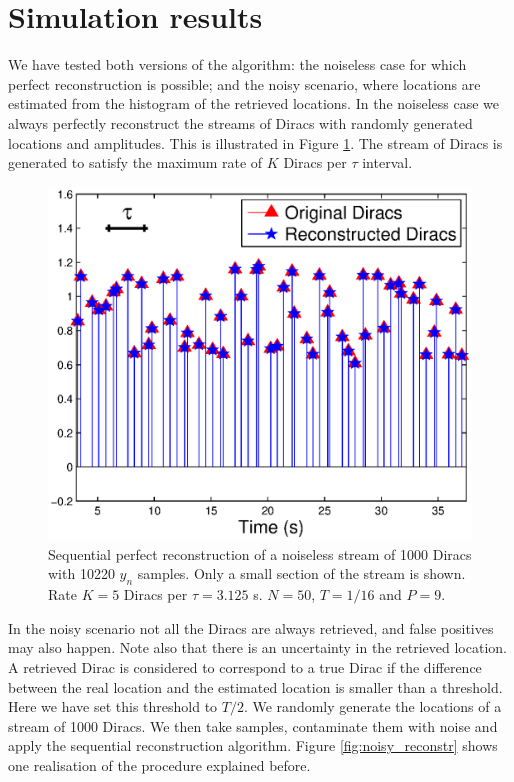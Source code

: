 \documentclass{article}
\providecommand{\red}[1]{\textcolor{red}{#1}}
\begin{document}
\section{Simulation results}
\label{sec:simulations}

We have tested both versions of the algorithm: the noiseless case for which perfect
reconstruction is possible; and the noisy scenario, where locations are estimated from
the histogram of the retrieved locations. In the noiseless case we always perfectly
reconstruct the streams of Diracs with randomly generated locations and amplitudes. 
This is illustrated in Figure \ref{fig:perf_reconstr}. The stream of Diracs is 
generated to satisfy the maximum rate of $K$ Diracs per $\tau$ interval.

\begin{figure}[t]
\centering
\includegraphics[width=.5\linewidth]{figures/diracs_perf_reconstr}
\caption{Sequential perfect reconstruction of a noiseless stream of 1000 Diracs with 10220 $y_n$ samples.
Only a small section of the stream is shown.
Rate $K=5$ Diracs per $\tau = 3.125$ s. $N=50$, $T=1/16$ and $P=9$. 
}
\label{fig:perf_reconstr}
\end{figure}

In the noisy scenario not all the Diracs are always
retrieved, and false positives may also happen. Note also that there is an uncertainty in 
the retrieved location. A retrieved Dirac is considered to correspond to a true Dirac if the difference 
between the real location and the estimated location is smaller than a threshold. Here we have 
set this threshold to $T/2$.
We randomly generate the locations of a stream of 1000 Diracs. We then take samples, 
contaminate them with noise and apply the sequential reconstruction algorithm. 
Figure \ref{fig:noisy_reconstr} shows one realisation of the procedure explained before.
\end{document}
